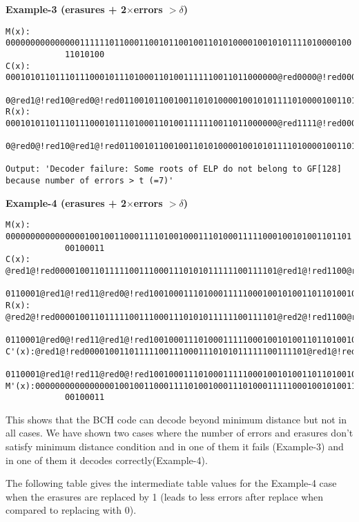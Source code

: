 \documentclass[10 pt]{article}
\begin{document}
\textbf{Example-3 (erasures + 2$\times$errors $> \delta$)}
\begin{lstlisting}
M(x): 0000000000000001111110110001100101100100110101000010010101111010000100
			11010100
C(x): 0001010110111011100010111010001101001111110011011000000@red0000@!red0000@red01@!red1@red111@!red1
			0@red1@!red10@red0@!red0110010110010011010100001001010111101000010011010100
R(x): 0001010110111011100010111010001101001111110011011000000@red1111@!red0000@red12@!red1@red200@!red1
			0@red0@!red10@red1@!red0110010110010011010100001001010111101000010011010100

Output: 'Decoder failure: Some roots of ELP do not belong to GF[128] because number of errors > t (=7)'
\end{lstlisting}
\textbf{Example-4 (erasures + 2$\times$errors $> \delta$)}
\begin{lstlisting}
M(x): 0000000000000000100100110001111010010001110100011111000100101001101101
			00100011
C(x): @red1@!red000010011011111001110001110101011111100111101@red1@!red1100@red0@!red00@red00@!red00@red00@!red00000@red1@!red0010
			0110001@red1@!red11@red0@!red1001000111010001111100010010100110110100100011
R(x): @red2@!red000010011011111001110001110101011111100111101@red2@!red1100@red1@!red00@red11@!red00@red21@!red00000@red2@!red0010
			0110001@red0@!red11@red1@!red1001000111010001111100010010100110110100100011
C'(x):@red1@!red000010011011111001110001110101011111100111101@red1@!red1100@red0@!red00@red00@!red00@red00@!red00000@red1@!red0010
			0110001@red1@!red11@red0@!red1001000111010001111100010010100110110100100011
M'(x):0000000000000000100100110001111010010001110100011111000100101001101101
			00100011
\end{lstlisting}
This shows that the BCH code can decode beyond minimum distance but not in all cases. We have shown two cases where the number of errors and erasures don't satisfy minimum distance condition and in one of them it fails (Example-3) and in one of them it decodes correctly(Example-4).

The following table gives the intermediate table values for the Example-4 case when the erasures are replaced by 1 (leads to less errors after replace when compared to replacing with 0).
\end{document}
